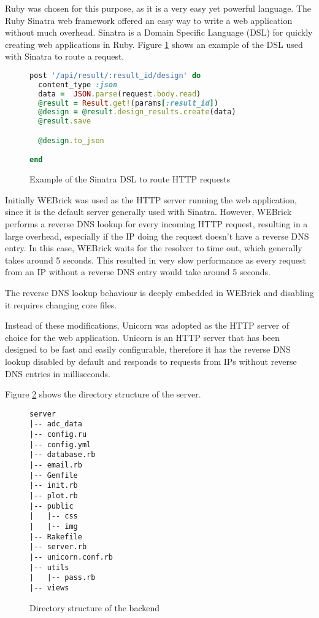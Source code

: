 Ruby was chosen for this purpose, as it is a very easy yet powerful language. The
Ruby Sinatra web framework offered an easy way to write a web application without much overhead.
Sinatra is a Domain Specific Language (DSL) for quickly creating web applications in Ruby. Figure
\ref{fig:sinatra_dsl} shows an example of the DSL used with Sinatra to route a request.
\begin{figure}[htb]
\begin{lstlisting}[language=Ruby]
post '/api/result/:result_id/design' do
  content_type :json
  data =  JSON.parse(request.body.read)
  @result = Result.get!(params[:result_id])
  @design = @result.design_results.create(data)
  @result.save

  @design.to_json

end
\end{lstlisting}
\caption{Example of the Sinatra DSL to route HTTP requests}
\label{fig:sinatra_dsl}
\end{figure}



Initially WEBrick was used as the HTTP server running the web application, since it is
the default server generally used with Sinatra. However, WEBrick performs a reverse DNS lookup
for every incoming HTTP request, resulting in a large overhead, especially if the IP doing the
request doesn't have a reverse DNS entry. In this case, WEBrick waits for the resolver to time out,
which generally takes around 5 seconds. This resulted in very slow performance as every request
from an IP without a reverse DNS entry would take around 5 seconds.

The reverse DNS lookup behaviour is deeply embedded in WEBrick and disabling it requires
changing core files.

Instead of these modifications, Unicorn was adopted as the HTTP server of choice for the
web application. Unicorn is an HTTP server that has been designed to be fast and easily configurable,
therefore it has the reverse DNS lookup disabled by default and responds to requests from IPs without
reverse DNS entries in milliseconds.

Figure \ref{fig:server_structure} shows the directory structure of the server.

\begin{figure}[h!]
\lstset{basicstyle=\scriptsize\ttfamily}
\begin{lstlisting}
server
|-- adc_data
|-- config.ru
|-- config.yml
|-- database.rb
|-- email.rb
|-- Gemfile
|-- init.rb
|-- plot.rb
|-- public
|   |-- css
|   |-- img
|-- Rakefile
|-- server.rb
|-- unicorn.conf.rb
|-- utils
|   |-- pass.rb
|-- views
\end{lstlisting}
\caption{Directory structure of the backend}
\label{fig:server_structure}
\end{figure}


